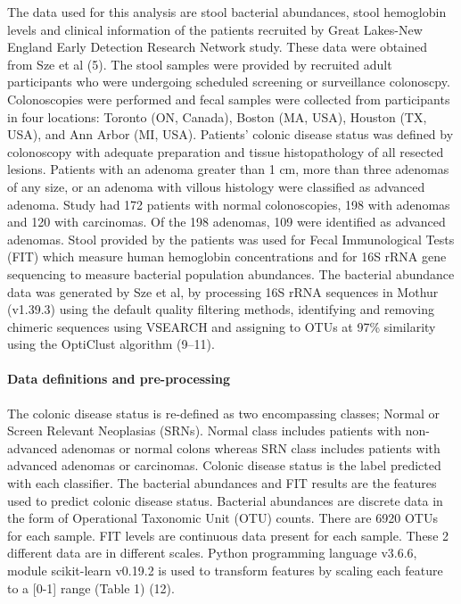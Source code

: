 \documentclass[11pt,]{article}
\let\oldparagraph\paragraph
\renewcommand{\paragraph}[1]{\oldparagraph{#1}\mbox{}}
\begin{document}
The data used for this analysis are stool bacterial abundances, stool
hemoglobin levels and clinical information of the patients recruited by
Great Lakes-New England Early Detection Research Network study. These
data were obtained from Sze et al (5). The stool samples were provided
by recruited adult participants who were undergoing scheduled screening
or surveillance colonoscpy. Colonoscopies were performed and fecal
samples were collected from participants in four locations: Toronto (ON,
Canada), Boston (MA, USA), Houston (TX, USA), and Ann Arbor (MI, USA).
Patients' colonic disease status was defined by colonoscopy with
adequate preparation and tissue histopathology of all resected lesions.
Patients with an adenoma greater than 1 cm, more than three adenomas of
any size, or an adenoma with villous histology were classified as
advanced adenoma. Study had 172 patients with normal colonoscopies, 198
with adenomas and 120 with carcinomas. Of the 198 adenomas, 109 were
identified as advanced adenomas. Stool provided by the patients was used
for Fecal Immunological Tests (FIT) which measure human hemoglobin
concentrations and for 16S rRNA gene sequencing to measure bacterial
population abundances. The bacterial abundance data was generated by Sze
et al, by processing 16S rRNA sequences in Mothur (v1.39.3) using the
default quality filtering methods, identifying and removing chimeric
sequences using VSEARCH and assigning to OTUs at 97\% similarity using
the OptiClust algorithm (9--11).

\paragraph{Data definitions and
pre-processing}\label{data-definitions-and-pre-processing}

The colonic disease status is re-defined as two encompassing classes;
Normal or Screen Relevant Neoplasias (SRNs). Normal class includes
patients with non-advanced adenomas or normal colons whereas SRN class
includes patients with advanced adenomas or carcinomas. Colonic disease
status is the label predicted with each classifier. The bacterial
abundances and FIT results are the features used to predict colonic
disease status. Bacterial abundances are discrete data in the form of
Operational Taxonomic Unit (OTU) counts. There are 6920 OTUs for each
sample. FIT levels are continuous data present for each sample. These 2
different data are in different scales. Python programming language
v3.6.6, module scikit-learn v0.19.2 is used to transform features by
scaling each feature to a {[}0-1{]} range (Table 1) (12).
\end{document}
